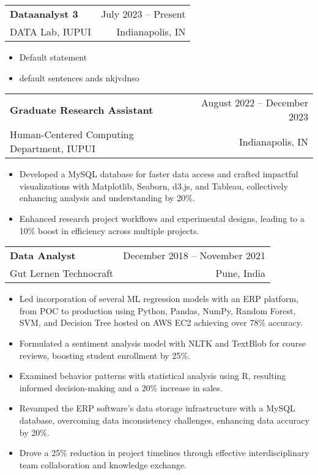 \documentclass[letterpaper,11pt]{article}
\makeatletter
\newcommand{\resumeItem}[1]{
  \item\small{
    {#1 \vspace{-2pt}}
  }
}
\newcommand{\resumeSubheading}[4]{
  \vspace{-2pt}\item
    \begin{tabular*}{0.97\textwidth}[t]{l@{\extracolsep{\fill}}r}
      \textbf{#1} & #2 \\
    \small#3 & \small #4 \\
    \end{tabular*}\vspace{-7pt}
}
\newcommand{\resumeItemListStart}{\begin{itemize}}
\newcommand{\resumeItemListEnd}{\end{itemize}\vspace{-5pt}}
\newcommand{\JobDescriptionDataAnalystOne}{Default statement}
\newcommand{\JobDescriptionDataAnalystTwo}{default sentences ands nkjvdnso}
\makeatother
\begin{document}
    \resumeSubheading
      {Dataanalyst 3}{July 2023 -- Present}
      {DATA Lab, IUPUI}{Indianapolis, IN}
      \resumeItemListStart
        \resumeItem{\JobDescriptionDataAnalystOne}
        \resumeItem{\JobDescriptionDataAnalystTwo}
      \resumeItemListEnd

    \resumeSubheading
      {Graduate Research Assistant}{August 2022 -- December 2023}
      {Human-Centered Computing Department, IUPUI}{Indianapolis, IN}
      \resumeItemListStart
        \resumeItem{Developed a MySQL database for faster data access and crafted impactful visualizations with Matplotlib, Seaborn, d3.js, and Tableau, collectively enhancing analysis and understanding by 20\%.}
        \resumeItem{Enhanced research project workflows and experimental designs, leading to a 10\% boost in efficiency across multiple projects.}
      \resumeItemListEnd


    \resumeSubheading
      {Data Analyst}{December 2018 -- November 2021}
      {Gut Lernen Technocraft}{Pune, India}
      \resumeItemListStart
        \resumeItem{Led incorporation of several ML regression models with an ERP platform, from POC to production using Python, Pandas, NumPy, Random Forest, SVM, and Decision Tree hosted on AWS EC2 achieving over 78\% accuracy.}
        \resumeItem{Formulated a sentiment analysis model with NLTK and TextBlob for course reviews, boosting student enrollment by 25\%.}
        \resumeItem{Examined behavior patterns with statistical analysis using R, resulting informed decision-making and a 20\% increase in sales.}
        \resumeItem{Revamped the ERP software's data storage infrastructure with a MySQL database, overcoming data inconsistency challenges, enhancing data accuracy by 20\%.}
        \resumeItem{Drove a 25\% reduction in project timelines through effective interdisciplinary team collaboration and knowledge exchange.}
        
    \resumeItemListEnd

\end{document}
